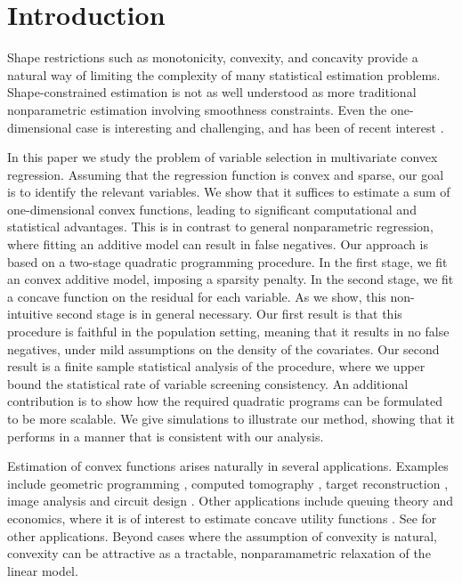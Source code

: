 \section{Introduction}


Shape restrictions such as monotonicity, convexity, and concavity
provide a natural way of limiting the complexity of many statistical
estimation problems.  Shape-constrained estimation is not as well
understood as more traditional nonparametric estimation involving
smoothness constraints.  
Even the one-dimensional case is
interesting and challenging, and has been of recent interest \citep{guntusen:13}.

In this paper we study the problem of variable selection in
multivariate convex regression.  Assuming that the regression function
is convex and sparse, our goal is to identify the relevant variables.
We show that it suffices to estimate a sum of one-dimensional convex
functions, leading to significant computational and statistical
advantages.  This is in contrast to general nonparametric regression,
where fitting an additive model can result in false negatives.  Our
approach is based on a two-stage quadratic programming procedure.  In
the first stage, we fit an convex additive model, imposing a sparsity
penalty.  In the second stage, we fit a concave function on the
residual for each variable.  As we show, this non-intuitive second
stage is in general necessary.  Our first result is that this
procedure is faithful in the population setting, meaning that it
results in no false negatives, under mild assumptions on the density
of the covariates.  Our second result is a finite sample statistical
analysis of the procedure, where we upper bound the statistical rate
of variable screening consistency.  An additional contribution is to show how the
required quadratic programs can be formulated to be more scalable.  We
give simulations to illustrate our method, showing that it performs in
a manner that is consistent with our analysis.

Estimation of convex functions arises naturally in several
applications.  Examples include geometric programming \citep{Boyd04},
computed tomography \citep{Prince:90}, target reconstruction
\citep{Lele:92}, image analysis \citep{Golden:06} and circuit design
\citep{Hannah:12}.  Other applications include queuing theory
\citep{Chen:01} and economics, where it is of interest to estimate
concave utility functions \citep{Pratt:68}.  See \cite{Lim:12} for
other applications.  
Beyond cases where the assumption of convexity is
natural, convexity can be attractive as a
tractable, nonparamametric relaxation of the linear model.  

